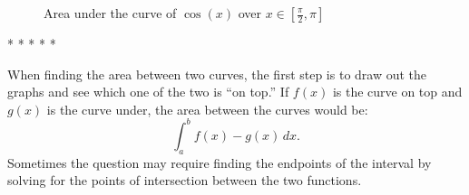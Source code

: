 \documentclass[12pt]{article}
\begin{document}
\begin{figure}[H]
    \begin{center}
        \caption{Area under the curve of $\cos(x)$ over $x \in [\frac{\pi}{2}, \pi]$}
        \label{fig:auccosx2}
    \end{center}
\end{figure}

\begin{center}
    * * * * *
\end{center}

When finding the area between two curves, the first step is to draw out the graphs and see which one of the two is ``on top.'' If $f(x)$ is the curve on top and $g(x)$ is the curve under, the area between the curves would be:
\[ \int_a^b f(x) - g(x) \, dx. \]
Sometimes the question may require finding the endpoints of the interval by solving for the points of intersection between the two functions.
\end{document}
